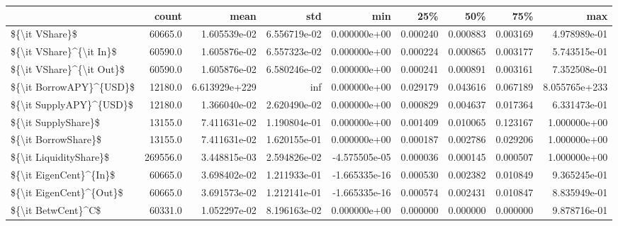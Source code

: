 \begin{tabular}{lrrrrrrrr}
\toprule
{} &     count &           mean &           std &           min &        25\% &        50\% &        75\% &            max \\
\midrule
\$\{\textbackslash it VShare\}\$             &   60665.0 &   1.605539e-02 &  6.556719e-02 &  0.000000e+00 &   0.000240 &   0.000883 &   0.003169 &   4.978989e-01 \\
\$\{\textbackslash it VShare\}\textasciicircum \{\textbackslash it In\}\$    &   60590.0 &   1.605876e-02 &  6.557323e-02 &  0.000000e+00 &   0.000224 &   0.000865 &   0.003177 &   5.743515e-01 \\
\$\{\textbackslash it VShare\}\textasciicircum \{\textbackslash it Out\}\$   &   60590.0 &   1.605876e-02 &  6.580246e-02 &  0.000000e+00 &   0.000241 &   0.000891 &   0.003161 &   7.352508e-01 \\
\$\{\textbackslash it BorrowAPY\}\textasciicircum \{USD\}\$    &   12180.0 &  6.613929e+229 &           inf &  0.000000e+00 &   0.029179 &   0.043616 &   0.067189 &  8.055765e+233 \\
\$\{\textbackslash it SupplyAPY\}\textasciicircum \{USD\}\$    &   12180.0 &   1.366040e-02 &  2.620490e-02 &  0.000000e+00 &   0.000829 &   0.004637 &   0.017364 &   6.331473e-01 \\
\$\{\textbackslash it SupplyShare\}\$        &   13155.0 &   7.411631e-02 &  1.190804e-01 &  0.000000e+00 &   0.001409 &   0.010065 &   0.123167 &   1.000000e+00 \\
\$\{\textbackslash it BorrowShare\}\$        &   13155.0 &   7.411631e-02 &  1.620155e-01 &  0.000000e+00 &   0.000187 &   0.002786 &   0.029206 &   1.000000e+00 \\
\$\{\textbackslash it LiquidityShare\}\$     &  269556.0 &   3.448815e-03 &  2.594826e-02 & -4.575505e-05 &   0.000036 &   0.000145 &   0.000507 &   1.000000e+00 \\
\$\{\textbackslash it EigenCent\}\textasciicircum \{In\}\$     &   60665.0 &   3.698402e-02 &  1.211933e-01 & -1.665335e-16 &   0.000530 &   0.002382 &   0.010849 &   9.365245e-01 \\
\$\{\textbackslash it EigenCent\}\textasciicircum \{Out\}\$    &   60665.0 &   3.691573e-02 &  1.212141e-01 & -1.665335e-16 &   0.000574 &   0.002431 &   0.010847 &   8.835949e-01 \\
\$\{\textbackslash it BetwCent\}\textasciicircum C\$         &   60331.0 &   1.052297e-02 &  8.196163e-02 &  0.000000e+00 &   0.000000 &   0.000000 &   0.000000 &   9.878716e-01 \\

\end{tabular}
